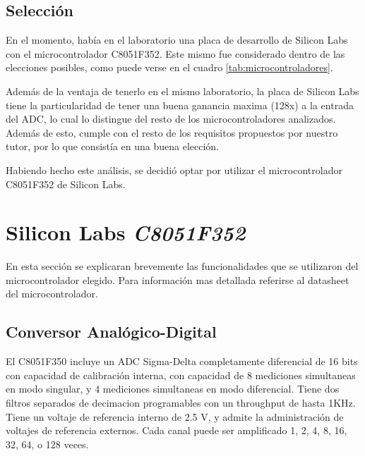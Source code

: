 \documentclass{article}
\theoremstyle{definition}
\theoremstyle{remark}
\begin{document}
\subsection{Selecci\'on} %
\label{sub:seleccion}

En el momento, había en el laboratorio una placa de desarrollo de Silicon Labs con el microcontrolador C8051F352. Este mismo fue considerado dentro de las elecciones posibles, como puede verse en el cuadro \ref{tab:microcontroladores}.

Además de la ventaja de tenerlo en el mismo laboratorio, la placa de Silicon Labs tiene la particularidad de tener una buena ganancia maxima (128x) a la entrada del ADC, lo cual lo distingue del resto de los microcontroladores analizados. Además de esto, cumple con el resto de los requisitos propuestos por nuestro tutor, por lo que consistía en una buena elección.

Habiendo hecho este análisis, se decidió optar por utilizar el microcontrolador C8051F352 de Silicon Labs.






\section{Silicon Labs \emph{C8051F352}} %
\label{sec:silicon_labs_c8051f352}

En esta sección se explicaran brevemente las funcionalidades que se utilizaron del microcontrolador elegido. Para información mas detallada referirse al datasheet del microcontrolador. \cite{bib:datasheet}

\subsection{Conversor Analógico-Digital}\label{sec:adc}
El C8051F350 incluye un ADC Sigma-Delta completamente diferencial de 16 bits con capacidad de calibración interna, con capacidad de 8 mediciones simultaneas en modo singular, y 4 mediciones simultaneas en modo diferencial. Tiene dos filtros separados de decimacion programables con un throughput de hasta 1KHz. Tiene un voltaje de referencia interno de 2.5 V, y admite la administración de voltajes de referencia externos. Cada canal puede ser amplificado 1, 2, 4, 8, 16, 32, 64, o 128 veces.
\end{document}
